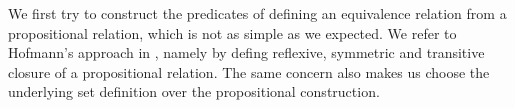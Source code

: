 We first try to construct the predicates of defining an equivalence relation from a propositional relation, which is not as simple as we expected. We refer to Hofmann's approach in \cite{hof:95:sm}, namely by defing reflexive, symmetric and transitive closure of a propositional relation. The same concern also makes us choose the underlying set definition over the propositional construction.

\begin{code}
%
\\
\> \AgdaSymbol{:} \AgdaSymbol{(} \AgdaSymbol{:} \AgdaSymbol{)(}  \AgdaSymbol{:}     \AgdaSymbol{)} \<[43]%
\>[43]\<%
\\
\>[0]\<[9]%
\>[9]     \<%
\\
\>     \<%
\\
\>[9]\<[10]%
\>[10]\AgdaSymbol{=} \<%
\\
\>[10]\<[12]%
\>[12]\AgdaSymbol{\{}  \AgdaSymbol{=}  \AgdaSymbol{(} \AgdaSymbol{:}     \AgdaSymbol{)} \<[43]%
\>[43]\<%
\\
\>[12]\<[18]%
\>[18]     \AgdaFunction{<}    \AgdaFunction{>}  \AgdaFunction{<}    \AgdaFunction{>}\AgdaSymbol{)}\<%
\\
\>[12]\<[18]%
\>[18]      \AgdaFunction{<}    \AgdaFunction{>}  \AgdaFunction{<}    \AgdaFunction{>}  \AgdaFunction{<}    \AgdaFunction{>}\AgdaSymbol{)}\<%
\\
\>[12]\<[18]%
\>[18]     \AgdaFunction{<}    \AgdaFunction{>}  \AgdaFunction{<}    \AgdaFunction{>}\AgdaSymbol{)}\<%

\end{code}
